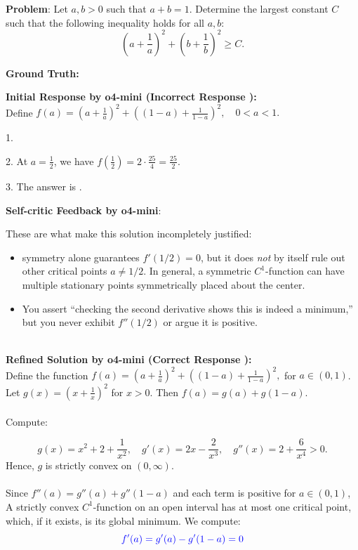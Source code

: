 \begin{examplebox}
\textbf{Problem}: Let $a, b > 0$ such that $a + b = 1$. Determine the largest constant $C$ such that the following inequality holds for all $a, b$:
$$
\left(a+\frac{1}{a}\right)^2+\left(b+\frac{1}{b}\right)^2 \geq C.
$$

\textbf{Ground Truth:} 


\textbf{Initial Response by o4-mini (Incorrect Response \xmark):}\\
Define
$
f(a) = \left(a + \frac{1}{a} \right)^2 + \left((1 - a) + \frac{1}{1 - a} \right)^2, \quad 0 < a < 1.
$

1. 

2. At \( a = \frac{1}{2} \), we have
    $
    f\left(\frac{1}{2}\right) = 2 \cdot \frac{25}{4} = \frac{25}{2}.
    $

3.  The answer is .

\textbf{Self-critic Feedback by o4-mini}:

These are what make this solution incompletely justified:

\begin{itemize}
    \item symmetry alone guarantees \( f'(1/2) = 0 \), but it does \emph{not} by itself rule out other critical points \( a \ne 1/2 \). In general, a symmetric \( C^1 \)-function can have multiple stationary points symmetrically placed about the center. 
    
    \item You assert ``checking the second derivative shows this is indeed a minimum,'' but you never exhibit \( f''(1/2) \) or argue it is positive. 
\end{itemize}
$\quad$\\
\textbf{Refined Solution by o4-mini (Correct Response \cmark):} \\Define the function
$
f(a) = \left(a + \frac{1}{a} \right)^2 + \left((1 - a) + \frac{1}{1 - a} \right)^2,
$
for \( a \in (0,1) \). Let \( g(x) = \left(x + \frac{1}{x} \right)^2 \) for \( x > 0 \). Then \( f(a) = g(a) + g(1 - a) \).
\\
\\
Compute:

\[
g(x) = x^2 + 2 + \frac{1}{x^2}, \quad g'(x) = 2x - \frac{2}{x^3}, \quad g''(x) = 2 + \frac{6}{x^4} > 0.
\]
Hence, \( g \) is strictly convex on \( (0, \infty) \).
\\\\
Since \( f''(a) = g''(a) + g''(1 - a) \) and each term is positive for \( a \in (0,1) \), 
A strictly convex \( C^1 \)-function on an open interval has at most one critical point, which, if it exists, is its global minimum. We compute:
\[{\textcolor{blue}{
f'(a) = g'(a) - g'(1 - a)=0}}
\]


\end{examplebox}
